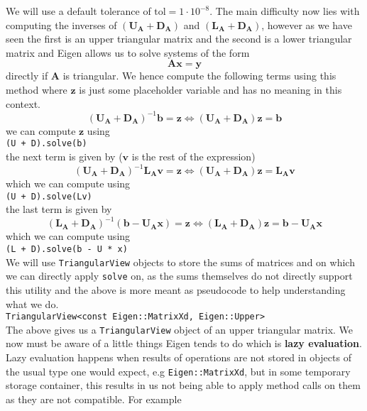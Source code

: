 \documentclass{article}
\newcommand\DA{\mathbf{D}_{\mathbf{A}}}
\newcommand\LA{\mathbf{L}_{\mathbf{A}}}
\newcommand\UA{\mathbf{U}_{\mathbf{A}}}
\begin{document}
\noindent We will use a default tolerance of $\text{tol} = 1\cdot 10^{-8}$. The main difficulty now lies with computing the inverses of $\left(\UA + \DA\right)$ and $\left(\LA + \DA\right)$, however as we have seen the first is an upper triangular matrix and the second is a lower triangular matrix and Eigen allows us to solve systems of the form 
\begin{equation*}
    \mathbf{A}\mathbf{x} = \mathbf{y}
\end{equation*}
directly if $\mathbf{A}$ is triangular. We hence compute the following terms using this method where $\mathbf{z}$ is just some placeholder variable and has no meaning in this context.
\begin{equation*}
    \left(\UA + \DA\right)^{-1}\mathbf{b} = \mathbf{z} \Longleftrightarrow \left(\UA + \DA\right)\mathbf{z} = \mathbf{b}
\end{equation*}
we can compute $\mathbf{z}$ using \\[2mm]
\verb|(U + D).solve(b)| \\[1mm]
the next term is given by ($\mathbf{v}$ is the rest of the expression)
\begin{equation*}
    \left(\UA + \DA\right)^{-1}\LA\mathbf{v} = \mathbf{z} \Longleftrightarrow \left(\UA + \DA\right)\mathbf{z} = \LA\mathbf{v}
\end{equation*}
which we can compute using
\\[2mm]
\verb|(U + D).solve(Lv)| \\[1mm]
the last term is given by
\begin{equation*}
    \left(\LA + \DA\right)^{-1}\left(\mathbf{b} - \UA\mathbf{x}\right) = \mathbf{z} \Longleftrightarrow  \left(\LA + \DA\right)\mathbf{z} = \mathbf{b} - \UA\mathbf{x}
\end{equation*}
which we can compute using \\[2mm]
\verb|(L + D).solve(b - U * x)| \\[1mm]
We will use \verb|TriangularView| objects to store the sums of matrices and on which we can directly apply \verb|solve| on, as the sums themselves do not directly support this utility and the above is more meant as pseudocode to help understanding what we do. \\[2mm]
\verb|TriangularView<const Eigen::MatrixXd, Eigen::Upper>| \\[1mm]
The above gives us a \verb|TriangularView| object of an upper triangular matrix. We now must be aware of a little things Eigen tends to do which is \textbf{lazy evaluation}. Lazy evaluation happens when results of operations are not stored in objects of the usual type one would expect, e.g \verb|Eigen::MatrixXd|, but in some temporary storage container, this results in us not being able to apply method calls on them as they are not compatible. For example  \\[2mm]
\end{document}
